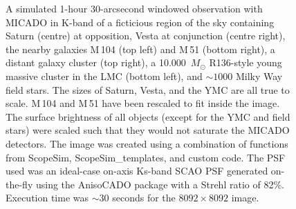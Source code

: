 \documentclass[a4paper,11pt]{article}
\begin{document}
\begin{figure}

\caption{A simulated 1-hour 30-arcsecond windowed observation with
  MICADO in K-band of a ficticious region of the sky containing Saturn
  (centre) at opposition, Vesta at conjunction (centre right), the
  nearby galaxies M\,104 (top left) and M\,51 (bottom right), a
  distant galaxy cluster (top right), a 10.000~$M_{\odot}$ R136-style
  young massive cluster in the LMC (bottom left), and $\sim 1000$
  Milky Way field stars.  The sizes of Saturn, Vesta, and the YMC are
  all true to scale.  M\,104 and M\,51 have been rescaled to fit
  inside the image.  The surface brightness of all objects (except for
  the YMC and field stars) were scaled such that they would not
  saturate the MICADO detectors.  The image was created using a
  combination of functions from ScopeSim, ScopeSim\_templates, and
  custom code.  The PSF used was an ideal-case on-axis Ks-band SCAO
  PSF generated on-the-fly using the AnisoCADO package with a Strehl
  ratio of 82\%.  Execution time was $\sim 30$ seconds for the
  $8092\times8092$ image.  }
\label{fig-title-page}

\end{figure}

\cleardoublepage


\setcounter{tocdepth}{3}
\tableofcontents
\cleardoublepage






\end{document}
